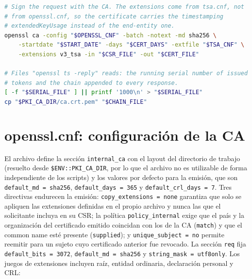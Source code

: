 \begin{lstlisting}[language=bash, caption={Firma con extensiones de \texttt{tsa.cnf} y preparación del directorio TSA en \texttt{pki/issue-tsa-cert.sh}.}, label={lst:pki-issue-tsa}]
# Sign the request with the CA. The extensions come from tsa.cnf, not
# from openssl.cnf, so the certificate carries the timestamping
# extendedKeyUsage instead of the end-entity one.
openssl ca -config "$OPENSSL_CNF" -batch -notext -md sha256 \
    -startdate "$START_DATE" -days "$CERT_DAYS" -extfile "$TSA_CNF" \
    -extensions v3_tsa -in "$CSR_FILE" -out "$CERT_FILE"

# Files "openssl ts -reply" reads: the running serial number of issued
# tokens and the chain appended to every response.
[ -f "$SERIAL_FILE" ] || printf '1000\n' > "$SERIAL_FILE"
cp "$PKI_CA_DIR/ca.crt.pem" "$CHAIN_FILE"
\end{lstlisting}

\section{openssl.cnf: configuración de la CA}\label{sec:pki-openssl-cnf}

El archivo define la sección \texttt{internal\_ca} con el layout del directorio de trabajo (resuelto desde \texttt{\$ENV::PKI\_CA\_DIR}, por lo que el archivo no es utilizable de forma independiente de los scripts) y los valores por defecto para la emisión, que son \texttt{default\_md = sha256}, \texttt{default\_days = 365} y \texttt{default\_crl\_days = 7}. Tres directivas endurecen la emisión: \texttt{copy\_extensions = none} garantiza que solo se apliquen las extensiones definidas en el propio archivo y nunca las que el solicitante incluya en su CSR; la política \texttt{policy\_internal} exige que el país y la organización del certificado emitido coincidan con los de la CA (\texttt{match}) y que el common name esté presente (\texttt{supplied}); y \texttt{unique\_subject = no} permite reemitir para un sujeto cuyo certificado anterior fue revocado. La sección \texttt{req} fija \texttt{default\_bits = 3072}, \texttt{default\_md = sha256} y \texttt{string\_mask = utf8only}. Los juegos de extensiones incluyen raíz, entidad ordinaria, declaración personal y CRL:


